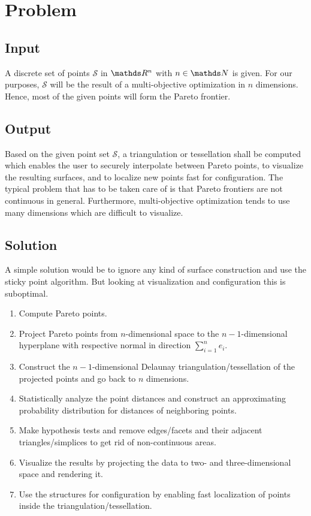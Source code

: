 \documentclass{stdlocal}
\begin{document}
\section{Problem} %
\label{sec:problem}
  \subsection{Input} %
  \label{sub:input}
    A discrete set of points $\mathcal{S}$ in $\realnumbers^n$ with $n\in\naturalnumbers$ is given.
    For our purposes, $\mathcal{S}$ will be the result of a multi-objective optimization in $n$ dimensions.
    Hence, most of the given points will form the Pareto frontier.

  \subsection{Output} %
  \label{sub:output}
    Based on the given point set $\mathcal{S}$, a triangulation or tessellation shall be computed which enables the user to securely interpolate between Pareto points, to visualize the resulting surfaces, and to localize new points fast for configuration.
    The typical problem that has to be taken care of is that Pareto frontiers are not continuous in general.
    Furthermore, multi-objective optimization tends to use many dimensions which are difficult to visualize.

  \subsection{Solution} %
  \label{sub:solution}
    A simple solution would be to ignore any kind of surface construction and use the sticky point algorithm.
    But looking at visualization and configuration this is suboptimal.

    \begin{enumerate}
      \item Compute Pareto points.
      \item Project Pareto points from $n$-dimensional space to the $n-1$-dimensional hyperplane with respective normal in direction $\sum_{i=1}^n e_i$.
      \item Construct the $n-1$-dimensional Delaunay triangulation/tessellation of the projected points and go back to $n$ dimensions.
      \item Statistically analyze the point distances and construct an approximating probability distribution for distances of neighboring points.
      \item Make hypothesis tests and remove edges/facets and their adjacent triangles/simplices to get rid of non-continuous areas.
      \item Visualize the results by projecting the data to two- and three-dimensional space and rendering it.
      \item Use the structures for configuration by enabling fast localization of points inside the triangulation/tessellation.
    \end{enumerate}
\end{document}
